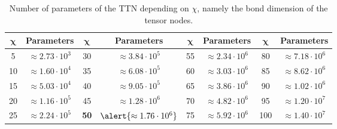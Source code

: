 \documentclass[xcolor=table,8pt]{beamer}
\begin{document}
\begin{frame}[t]
        \vspace{2pt}
        \begin{table}[!h]
            {\footnotesize
                \centering
                \begin{tabular}{cc|cc|cc|cc}
                    \toprule
                    \( \boldsymbol{\chi} \) & \textbf{Parameters} &
                    \( \boldsymbol{\chi} \) & \textbf{Parameters} &
                    \( \boldsymbol{\chi} \) & \textbf{Parameters} &
                    \( \boldsymbol{\chi} \) & \textbf{Parameters} \\
                    \midrule
                    5   & $ \approx 2.73 \cdot 10^{3} $ & 30  & $ \approx 3.84 \cdot 10^{5} $ & 55  & $ \approx 2.34 \cdot 10^{6} $ & 80  & $ \approx 7.18 \cdot 10^{6} $ \\ 
                    10  & $ \approx 1.60 \cdot 10^{4} $ & 35  & $ \approx 6.08 \cdot 10^{5} $ & 60  & $ \approx 3.03 \cdot 10^{6} $ & 85  & $ \approx 8.62 \cdot 10^{6} $ \\
                    15  & $ \approx 5.03 \cdot 10^{4} $ & 40  & $ \approx 9.05 \cdot 10^{5} $ & 65  & $ \approx 3.86 \cdot 10^{6} $ & 90  & $ \approx 1.02 \cdot 10^{6} $ \\
                    20  & $ \approx 1.16 \cdot 10^{5} $ & 45  & $ \approx 1.28 \cdot 10^{6} $ & 70  & $ \approx 4.82 \cdot 10^{6} $ & 95  & $ \approx 1.20 \cdot 10^{7} $ \\ 
                    25  & $ \approx 2.24 \cdot 10^{5} $ & \alert{\bfseries 50}  & $ \alert{\approx 1.76 \cdot 10^{6}} $ & 75  & $ \approx 5.92 \cdot 10^{6} $ & 100 & $ \approx 1.40 \cdot 10^{7} $\\  
                    \bottomrule
                \end{tabular}
            }
            \vspace{-2pt}
            \caption{Number of parameters of the TTN depending on \( \chi \), namely the bond dimension of the tensor nodes.}
            \label{tab:results_characterisation_parameters}
        \end{table}
        

\end{frame}
\end{document}
